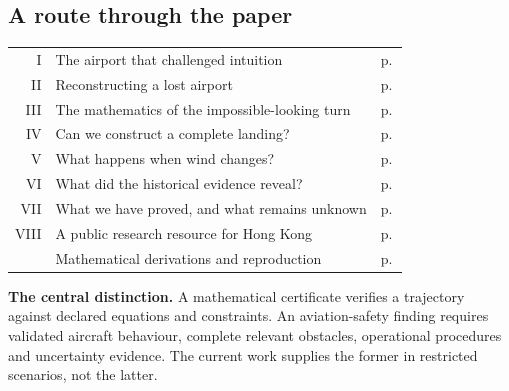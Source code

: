 \subsection*{A route through the paper}
{\small\begin{tabularx}{\textwidth}{@{}rXr@{}}
I & The airport that challenged intuition & p.\,\pageref{part:1}\\
II & Reconstructing a lost airport & p.\,\pageref{part:2}\\
III & The mathematics of the impossible-looking turn & p.\,\pageref{part:3}\\
IV & Can we construct a complete landing? & p.\,\pageref{part:4}\\
V & What happens when wind changes? & p.\,\pageref{part:5}\\
VI & What did the historical evidence reveal? & p.\,\pageref{part:6}\\
VII & What we have proved, and what remains unknown & p.\,\pageref{part:7}\\
VIII & A public research resource for Hong Kong & p.\,\pageref{part:8}\\
 & Mathematical derivations and reproduction & p.\,\pageref{app:dynamics}\\
\end{tabularx}}

\medskip\textbf{The central distinction.} A mathematical certificate verifies a trajectory against declared equations and constraints. An aviation-safety finding requires validated aircraft behaviour, complete relevant obstacles, operational procedures and uncertainty evidence. The current work supplies the former in restricted scenarios, not the latter.
\par\medskip
